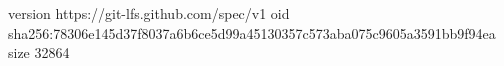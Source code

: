 version https://git-lfs.github.com/spec/v1
oid sha256:78306e145d37f8037a6b6ce5d99a45130357c573aba075c9605a3591bb9f94ea
size 32864
